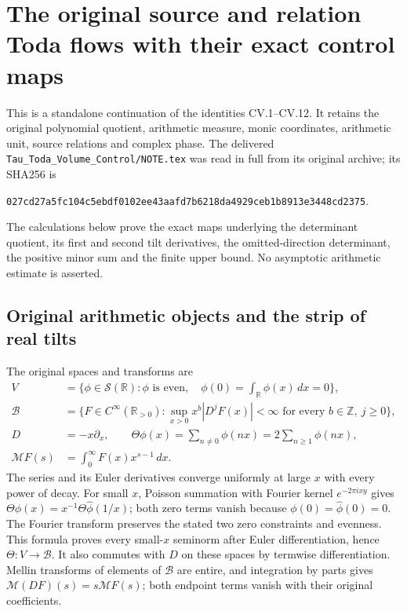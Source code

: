 \begingroup
\def\C{\mathbb C}
\def\R{\mathbb R}
\def\tr{\operatorname{Tr}}
\def\Span{\operatorname{span}}
\def\im{\operatorname{im}}
\def\Alt{\operatorname{Alt}}
\section{The original source and relation Toda flows with their exact control maps}



This is a standalone continuation of the identities CV.1--CV.12. It
retains the original polynomial quotient, arithmetic measure, monic
coordinates, arithmetic unit, source relations and complex phase. The
delivered \texttt{Tau\_Toda\_Volume\_Control/NOTE.tex} was read in full
from its original archive; its SHA256 is
\begin{center}\footnotesize
\texttt{027cd27a5fc104c5ebdf0102ee43aafd7b6218da4929ceb1b8913e3448cd2375}.
\end{center}
The calculations below prove the exact maps underlying the determinant
quotient, its first and second tilt derivatives, the omitted-direction
determinant, the positive minor sum and the finite upper bound. No
asymptotic arithmetic estimate is asserted.

\subsection{Original arithmetic objects and the strip of real tilts}

The original spaces and transforms are
\[
 \begin{split}
 V&=\{\phi\in\mathcal S(\R):\phi\text{ is even},\quad
                     \phi(0)=\int_\R\phi(x)\,dx=0\},\\
 \mathscr B&=\{F\in C^\infty(\R_{>0}):
       \sup_{x>0}x^b|D^jF(x)|<\infty
           \text{ for every }b\in\mathbb Z,\ j\ge0\},\\
 D&=-x\partial_x,\qquad
 \Theta\phi(x)=\sum_{n\ne0}\phi(nx)=2\sum_{n\ge1}\phi(nx),\\
 \mathcal MF(s)&=\int_0^\infty F(x)x^{s-1}\,dx.
 \end{split}
\]
The series and its Euler derivatives converge uniformly at large
$x$ with every power of decay. For small $x$, Poisson summation
with Fourier kernel $e^{-2\pi ixy}$ gives
$\Theta\phi(x)=x^{-1}\Theta\widehat\phi(1/x)$; both zero terms
vanish because $\phi(0)=\widehat\phi(0)=0$.
The Fourier transform preserves the stated two zero constraints
and evenness. This formula proves every small-$x$ seminorm after
Euler differentiation, hence $\Theta:V\to\mathscr B$.
It also commutes with $D$ on these spaces by termwise differentiation.
Mellin transforms of elements of $\mathscr B$ are entire, and
integration by parts gives $\mathcal M(DF)(s)=s\mathcal MF(s)$;
both endpoint terms vanish with their original coefficients.

